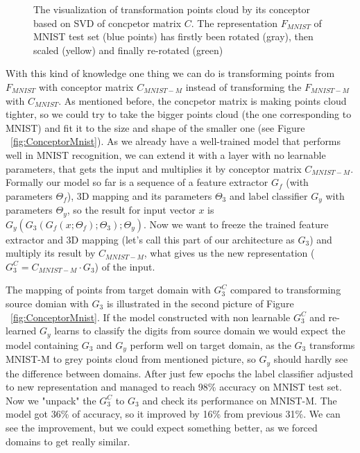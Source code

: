 \documentclass{article}
\begin{document}
\begin{figure}[htb]%
    \centering
    \qquad
    \qquad
    \qquad
    \caption{The visualization of transformation points cloud by its conceptor based on SVD of concpetor matrix $C$. The representation $F_{MNIST}$ of MNIST test set (blue points) has firstly been rotated (gray), then scaled (yellow) and finally re-rotated (green)}%
    \label{fig:ConceptorRotation}%
\end{figure}
\par
With this kind of knowledge one thing we can do is transforming points from $F_{MNIST}$ with conceptor matrix $C_{MNIST-M}$ instead of transforming the $F_{MNIST-M}$ with $C_{MNIST}$. As mentioned before, the concpetor matrix is making points cloud tighter, so we could try to take the bigger points cloud (the one corresponding to MNIST) and fit it to the size and shape of the smaller one (see Figure ~\ref{fig:ConceptorMnist}). As we already have a well-trained model that performs well in MNIST recognition, we can extend it with a layer with no learnable parameters, that gets the input and multiplies it by conceptor matrix $C_{MNIST-M}$. Formally our model so far is a sequence of a feature extractor $G_{f}$ (with parameters $\Theta_{f}$), 3D mapping and its parameters $\Theta_{3}$ and label classifier $G_{y}$ with parameters $\Theta_{y}$, so the result for input vector $x$ is $G_{y}( G_{3}( G_{f}( x ; \Theta_{f}) ; \Theta_{3} ) ; \Theta_{y} )$. Now we want to freeze the trained feature extractor and 3D mapping (let's call this part of our architecture as $G_{3}$) and multiply its result by $C_{MNIST-M}$, what gives us the new representation ($G_{3} ^ {C} = C_{MNIST-M} \cdot G_{3}$) of the input.
\par
The mapping of points from target domain with $G_{3}^{C}$ compared to transforming source domian with $G_{3}$ is illustrated in the second picture of Figure ~\ref{fig:ConceptorMnist}. If the model constructed with non learnable $G_{3}^{C}$ and re-learned $G_{y}$ learns to classify the digits from source domain we would expect the model containing $G_{3}$ and $G_{y}$ perform well on target domain, as the $G_{3}$ transforms MNIST-M to grey points cloud from mentioned picture, so $G_{y}$ should hardly see the difference between domains. After just few epochs the label classifier adjusted to new representation and managed to reach 98\% accuracy on MNIST test set. Now we "unpack" the $G_{3}^{C}$ to $G_{3}$ and check its performance on MNIST-M. The model got 36\% of accuracy, so it improved by 16\% from previous 31\%. We can see the improvement, but we could expect something better, as we forced domains to get really similar.
\end{document}
